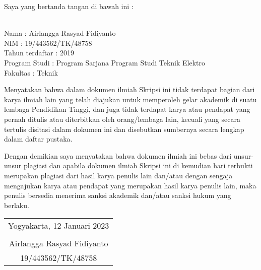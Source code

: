 \noindent Saya yang bertanda tangan di bawah ini :

\vspace{-1em}

\begin{tabbing}
\hspace{40mm} \= \\ %
\noindent Nama \> : Airlangga Rasyad Fidiyanto \\[\parskip]
\noindent NIM \> : 19/443562/TK/48758 \\[\parskip]
\noindent Tahun terdaftar \> : 2019 \\[\parskip]
\noindent Program Studi \> : Program Sarjana Program Studi Teknik Elektro \\[\parskip]
\noindent Fakultas \> : Teknik
\end{tabbing}

\noindent Menyatakan bahwa dalam dokumen ilmiah Skripsi ini tidak terdapat bagian dari karya ilmiah lain yang telah diajukan untuk memperoleh gelar akademik di suatu lembaga Pendidikan Tinggi, dan juga tidak terdapat karya atau pendapat yang pernah ditulis atau diterbitkan oleh orang/lembaga lain, kecuali yang secara tertulis disitasi dalam dokumen ini dan disebutkan sumbernya secara lengkap dalam daftar pustaka.

\noindent Dengan demikian saya menyatakan bahwa dokumen ilmiah ini bebas dari unsur-unsur plagiasi dan apabila dokumen ilmiah Skripsi ini di kemudian hari terbukti merupakan plagiasi dari hasil karya penulis lain dan/atau dengan sengaja mengajukan karya atau pendapat yang merupakan hasil karya penulis lain, maka penulis bersedia menerima sanksi akademik dan/atau sanksi hukum yang berlaku.


\begin{flushright}
	\begin{tabular}{c}
		Yogyakarta, 12 Januari 2023 \\
		\vspace{2.5cm} \\
		Airlangga Rasyad Fidiyanto \\ 19/443562/TK/48758
	\end{tabular}
\end{flushright}